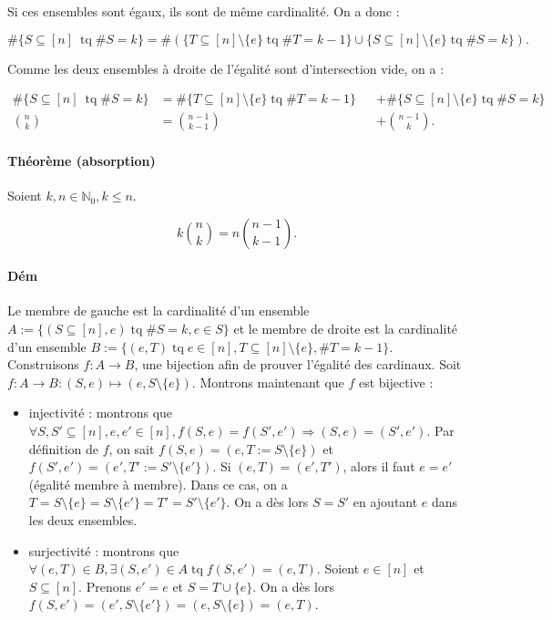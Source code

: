 \documentclass{article}
\DeclareMathOperator{\tq}{\text{ tq }}
\begin{document}
			Si ces ensembles sont égaux, ils sont de même cardinalité. On a donc :
			
			\[\#\{S \subseteq [n]\ \tq \#S = k\} = \#(\{T \subseteq [n] \setminus \{e\} \tq \#T = k-1\} \cup \{S \subseteq [n] \setminus \{e\} \tq \#S = k\}).\]
			
			Comme les deux ensembles à droite de l'égalité sont d'intersection vide, on a :
			
			\[\begin{aligned}
				\#\{S \subseteq [n]\ \tq \#S = k\} &= \#\{T \subseteq [n] \setminus \{e\} \tq \#T = k-1\} &&+ \#\{S \subseteq [n] \setminus \{e\} \tq \#S = k\} \\
				\binom nk						  &= \binom {n-1}{k-1}								   &&+ \binom {n-1}k.
			\end{aligned}\]
			
			\paragraph{Théorème (absorption)} Soient $k, n \in \mathbb N_0, k \leq n$.

			\[k\binom nk = n\binom {n-1}{k-1}.\]

			\paragraph{Dém} Le membre de gauche est la cardinalité d'un ensemble $A := \{(S \subseteq [n], e) \tq \#S = k, e \in S\}$ et le membre de droite est
			la cardinalité d'un ensemble $B := \{(e, T) \tq e \in [n], T \subseteq [n] \setminus \{e\}, \#T = k-1\}$. Construisons $f : A \to B$, une bijection afin de prouver
			l'égalité des cardinaux. Soit $f : A \to B : (S, e) \mapsto (e, S \setminus \{e\})$. Montrons maintenant que $f$ est bijective :

			\begin{itemize}
				\item injectivité : montrons que $\forall S, S' \subseteq [n], e, e' \in [n], f(S, e) = f(S', e') \Rightarrow (S, e) = (S', e')$.
				Par définition de $f$, on sait $f(S, e) = (e, T := S \setminus \{e\})$ et $f(S', e') = (e', T' := S' \setminus \{e'\})$. Si $(e, T) = (e', T')$,
				alors il faut $e = e'$ (égalité membre à membre). Dans ce cas, on a $T = S \setminus \{e\} = S \setminus \{e'\} = T' = S' \setminus \{e'\}$.
				On a dès lors $S = S'$ en ajoutant $e$ dans les deux ensembles.

				\item surjectivité : montrons que $\forall (e, T) \in B, \exists (S, e') \in A \tq f(S, e') = (e, T)$.
				Soient $e \in [n]$ et $S \subseteq [n]$. Prenons $e' = e$ et $S = T \cup \{e\}$. On a dès lors $f(S, e') = (e', S \setminus \{e'\})
				= (e, S \setminus \{e\}) = (e, T)$.
			\end{itemize}
\end{document}
